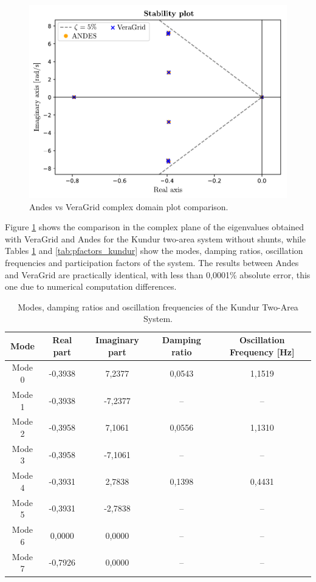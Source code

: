 \begin{figure}[H]
  \centering
  \includegraphics[width=0.7\linewidth]{inkscape_svg/andes_vs_veragrid_kundur.pdf}
  \caption{Andes vs VeraGrid complex domain plot comparison.}
  \label{fig:AndesvsVeraGrid}
\end{figure}


Figure \ref{fig:AndesvsVeraGrid} shows the comparison in the complex plane of the eigenvalues obtained
with VeraGrid and Andes for the Kundur two-area system without shunts, while Tables \ref{tab:eigenvalues_kundur} and
\ref{tab:pfactors_kundur} show the modes, damping ratios, oscillation frequencies and participation factors of the system.
The results between Andes and VeraGrid are practically identical, 
with less than 0,0001\% absolute error, this one due to numerical computation differences.


\begin{table}[H]
\centering
\caption{Modes, damping ratios and oscillation frequencies of the Kundur Two-Area System.}
\label{tab:eigenvalues_kundur}
\renewcommand{\arraystretch}{1.2}
\small
\begin{tabular}{|c|c|c|c|c|}
\hline
\textbf{Mode} & \textbf{Real part} & \textbf{Imaginary part} & \textbf{Damping ratio} & \textbf{Oscillation Frequency [Hz]} \\ 
\hline
Mode 0 & -0,3938 & 7,2377 & 0,0543 & 1,1519 \\
Mode 1 & -0,3938 & -7,2377 & -- & -- \\
Mode 2 & -0,3958 & 7,1061 & 0,0556 & 1,1310 \\
Mode 3 & -0,3958 & -7,1061 & -- & -- \\
Mode 4 & -0,3931 & 2,7838 & 0,1398 & 0,4431 \\
Mode 5 & -0,3931 & -2,7838 & -- & -- \\
Mode 6 & 0,0000  & 0,0000  & -- & -- \\
Mode 7 & -0,7926 & 0,0000  & -- & -- \\
\hline
\end{tabular}
\end{table}


